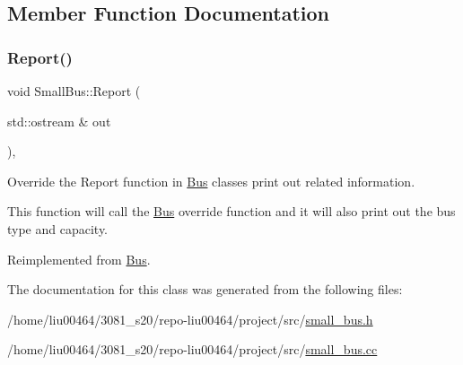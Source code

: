 \subsection{Member Function Documentation}
\mbox{\label{classSmallBus_a5759f6dd8c3738962730b6f0e28a9c05}} 
\subsubsection{\texorpdfstring{Report()}{Report()}}
{\footnotesize\ttfamily void Small\+Bus\+::\+Report (\begin{DoxyParamCaption}\item[{std\+::ostream \&}]{out }\end{DoxyParamCaption})\hspace{0.3cm}{\ttfamily [override]}, {\ttfamily [virtual]}}



Override the Report function in \hyperlink{classBus}{Bus} classes print out related information. 

This function will call the \hyperlink{classBus}{Bus} override function and it will also print out the bus type and capacity. 

Reimplemented from \hyperlink{classBus}{Bus}.



The documentation for this class was generated from the following files\+:\begin{DoxyCompactItemize}
\item 
/home/liu00464/3081\+\_\+s20/repo-\/liu00464/project/src/\hyperlink{small__bus_8h}{small\+\_\+bus.\+h}\item 
/home/liu00464/3081\+\_\+s20/repo-\/liu00464/project/src/\hyperlink{small__bus_8cc}{small\+\_\+bus.\+cc}\end{DoxyCompactItemize}
